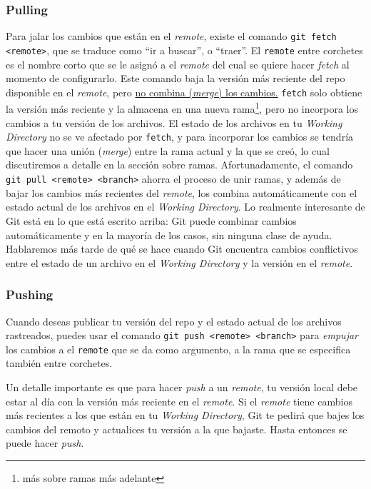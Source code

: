 \documentclass[spanish, 12pt, a4paper]{article}
\begin{document}
\subsubsection{Pulling}
Para jalar los cambios que están en el \textit{remote}, existe el comando \texttt{git fetch <remote>}, que se traduce como ``ir a buscar'', o ``traer''.
El \texttt{remote} entre corchetes es el nombre corto que se le asignó a el \textit{remote} del cual se quiere hacer \textit{fetch} al momento de configurarlo.
Este comando baja la versión más reciente del repo disponible en el \textit{remote}, pero \underline{no combina (\textit{merge}) los cambios.}
\texttt{fetch} solo obtiene la versión más reciente y la almacena en una nueva rama\footnote{más sobre ramas más adelante}, pero no incorpora los cambios a tu versión de los archivos.
El estado de los archivos en tu \textit{Working Directory} no se ve afectado por \texttt{fetch}, y para incorporar los cambios se tendría que hacer una unión (\textit{merge}) entre la rama actual y la que se creó, lo cual discutiremos a detalle en la sección sobre ramas.
Afortunadamente, el comando \texttt{git pull <remote> <branch>} ahorra el proceso de unir ramas, y además de bajar los cambios más recientes del \textit{remote}, los combina automáticamente con el estado actual de los archivos en el \textit{Working Directory}.
Lo realmente interesante de Git está en lo que está escrito arriba: Git puede combinar cambios automáticamente y en la mayoría de los casos, sin ninguna clase de ayuda.
Hablaremos más tarde de qué se hace cuando Git encuentra cambios conflictivos entre el estado de un archivo en el \textit{Working Directory} y la versión en el \textit{remote}. 

\subsubsection{Pushing}
Cuando deseas publicar tu versión del repo y el estado actual de los archivos rastreados, puedes usar el comando \texttt{git push <remote> <branch>} para \textit{empujar} los cambios a el \texttt{remote} que se da como argumento, a la rama que se especifica también entre corchetes.

Un detalle importante es que para hacer \textit{push} a un \textit{remote}, tu versión local debe estar al día con la versión más reciente en el \textit{remote}.
Si el \textit{remote} tiene cambios más recientes a los que están en tu \textit{Working Directory}, Git te pedirá que bajes los cambios del remoto y actualices tu versión a la que bajaste.
Hasta entonces se puede hacer \textit{push}.
\end{document}
